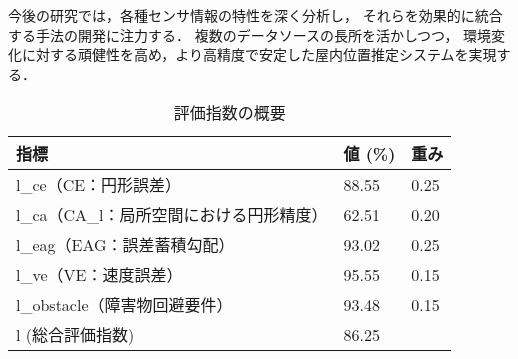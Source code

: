 今後の研究では，各種センサ情報の特性を深く分析し，
それらを効果的に統合する手法の開発に注力する．
複数のデータソースの長所を活かしつつ，
環境変化に対する頑健性を高め，より高精度で安定した屋内位置推定システムを実現する．


\begin{table}[ht]
	\caption{評価指数の概要}
	\centering
	\begin{tabular}{l|l|l}
		\hline
		指標                        & 値 (\%) & 重み   \\ \hline
		l\_ce（CE：円形誤差）            & 88.55  & 0.25 \\
		l\_ca（CA\_l：局所空間における円形精度） & 62.51  & 0.20 \\
		l\_eag（EAG：誤差蓄積勾配）        & 93.02  & 0.25 \\
		l\_ve（VE：速度誤差）            & 95.55  & 0.15 \\
		l\_obstacle（障害物回避要件）      & 93.48  & 0.15 \\
		l (総合評価指数)                & 86.25  &      \\ \hline
	\end{tabular}
	\label{table:evaluation_index}
\end{table}


